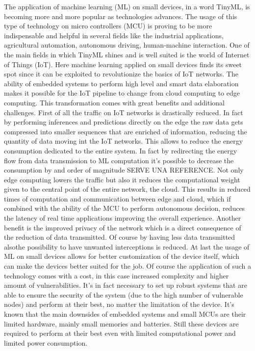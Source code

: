 \documentclass[12pt]{report}
\begin{document}
The application of machine learning (ML) on small devices, in a word TinyML, is becoming more and more popular as technologies advances. The usage of this type of technology on micro controllers (MCU) is proving to be more indispensable and helpful in several fields like the industrial applications, agricultural automation, autonomous driving, human-machine interaction. One of the main fields in which TinyML shines and is well suited is the world of Internet of Things (IoT). Here machine learning applied on small devices finds its sweet spot since it can be exploited to revolutionize the basics of IoT networks. The ability of embedded systems to perform high level and smart data elaboration makes it possible for the IoT pipeline to change from cloud computing to edge computing. This transformation comes with great benefits and additional challenges. 
First of all the traffic on IoT networks is drastically reduced. In fact by performing inferences and predictions directly on the edge the raw data gets compressed into smaller sequences that are enriched of information, reducing the quantity of data moving int the IoT networks. This allows to reduce the energy consumption dedicated to the entire system. In fact by redirecting the energy flow from data transmission to ML computation it's possible to decrease the consumption by and order of magnitude \cite{} SERVE UNA REFERENCE. 
Not only edge computing lowers the traffic but also it reduces the computational weight given to the central point of the entire network, the cloud. This results in reduced times of computation and communication between edge and cloud, which if combined with the ability of the MCU to perform autonomous decision, reduces the latency of real time applications improving the overall experience. 
Another benefit is the improved privacy of the network which is a direct consequence of the reduction of data transmitted. Of course by having less data transmitted alsothe possibility to have unwanted interceptions is reduced. At last the usage of ML on small devices allows for better customization of the device itself, which can make the devices better suited for the job. 
Of course the application of such a technology comes with a cost, in this case increased complexity and higher amount of vulnerabilities. It's in fact necessary to set up robust systems that are able to ensure the security of the system (due to the high number of vulnerable nodes) and perform at their best, no matter the limitation of the device. It's known that the main downsides of embedded systems and small MCUs are their limited hardware, mainly small memories and batteries. Still these devices are required to perform at their best even with limited computational power and limited power consumption.\\
\end{document}

